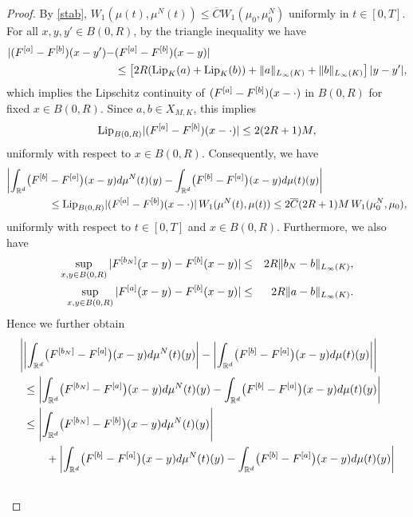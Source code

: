 \begin{proof}
	By \eqref{stab}, $W_1(\mu(t),\mu^N(t))\leq\overline{C}W_1(\mu_0,\mu_0^N)$ uniformly in $t \in [0,T]$.
	For all $x,y,y' \in B(0,R)$, by the triangle inequality we have
	\begin{align*}
		|(F^{[a]} -F^{[b]})(x-y') - &(F^{[a]} -F^{[b]})(x- y)|  \\
			& \leq \left[2R (\textup{Lip}_K(a) + \textup{Lip}_K( b))    +\|a\|_{L_\infty(K)} + \| b\|_{L_\infty(K)} \right] |y-y'|,
	\end{align*}
	which implies the Lipschitz continuity of $(F^{[a]} -F^{[b]})(x- \cdot)$ in $B(0,R)$ for fixed $x\in B(0,R)$. Since $a,b \in X_{M,K}$, this implies
	\begin{equation}\label{lipfafb}
		\textup{Lip}_{B(0,R)}|(F^{[a]} -F^{[b]})(x-\cdot)|\leq 2 (2R+1)M,
	\end{equation}
	uniformly with respect to $x \in B(0,R)$. Consequently, we have
	\begin{align*}
		\biggl|\int_{\mathbb{R}^d}\bigl(F^{[b]}
			&-F^{[a]}\bigr)(x-y)d\mu^{N}(t)(y)-\int_{\mathbb{R}^d}\bigl(F^{[b]}-F^{[a]}\bigr)(x-y)d\mu(t)(y)\biggr|\\
			&\leq\textup{Lip}_{B(0,R)}|(F^{[a]} -F^{[b]})(x-\cdot)|\,W_1(\mu^N(t),\mu(t))
				\leq 2 \overline{C}(2R+1)M\,W_1(\mu_0^N,\mu_0),
	\end{align*}
	uniformly with respect to $t\in [0,T]$ and $x\in B(0,R)$. Furthermore, we also have
	\begin{eqnarray}
		\sup_{x,y \in B(0,R)}|F^{[b_{N}]}(x-y)-F^{[b]}(x-y)|&\leq& 2R \| b_{N}- b\|_{L_\infty(K)},\label{absbounda}\\
	\sup_{x,y \in B(0,R)}|F^{[a]}(x-y)-F^{[b]}(x-y)|	&\leq& 2R \| a- b\|_{L_\infty(K)}. \label{absbound}
	\end{eqnarray}
	Hence we further obtain
	\begin{align} \label{machecazzo}
		\Biggl|
			&\biggl|\int_{\R^d}\bigl(\Fun{b_{N}}-\Fun{a}\bigr)(x-y)d\mu^{N}(t)(y)\biggr| 
				-\biggl|\int_{\R^d}\bigl(\Fun{b}-\Fun{a}\bigr)(x-y)d\mu(t)(y)\biggr|\Biggr|\\ \nonumber
			&\leq\biggl|\int_{\R^d}\bigl(\Fun{b_{N}}-\Fun{a}\bigr)(x-y)d\mu^{N}(t)(y)
					-\int_{\R^d}\bigl(\Fun{b}-\Fun{a}\bigr)(x-y)d\mu(t)(y)\biggr|\\ \nonumber
			&\leq\Biggl|\int_{\R^d}
				\bigl(\Fun{b_{N}}-\Fun{b}\bigr)(x-y)d\mu^{N}(t)(y)\Biggr|\\ \nonumber
			&\qquad +\biggl|\int_{\R^d}\bigl(\Fun{b}-\Fun{a}\bigr)(x-y)d\mu^{N}(t)(y)
					-\int_{\R^d}\bigl(\Fun{b}-\Fun{a}\bigr)(x-y)d\mu(t)(y)\biggr|\\ \nonumber

\end{align}
\end{proof}

